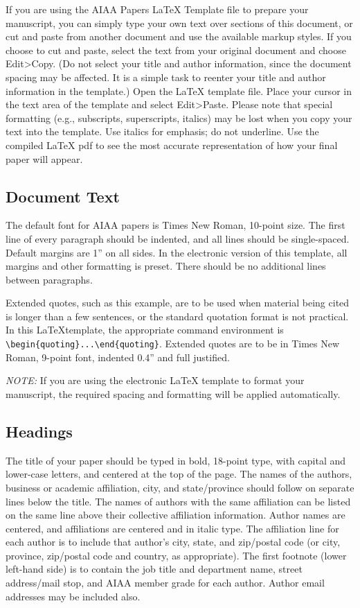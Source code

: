 \documentclass[conf]{new-aiaa}
\begin{document}
If you are using the AIAA Papers \LaTeX{} Template file to prepare your manuscript, you can simply type your own text over sections of this document, or cut and paste from another document and use the available markup styles. If you choose to cut and paste, select the text from your original document and choose Edit>Copy. (Do not select your title and author information, since the document spacing may be affected. It is a simple task to reenter your title and author information in the template.) Open the \LaTeX{} template file. Place your cursor in the text area of the template and select Edit>Paste. Please note that special formatting (e.g., subscripts, superscripts, italics) may be lost when you copy your text into the template. Use italics for emphasis; do not underline. Use the compiled \LaTeX{} pdf to see the most accurate representation of how your final paper will appear.

\subsection{Document Text}
The default font for AIAA papers is Times New Roman, 10-point size.  The first line of every paragraph should be indented, and all lines should be single-spaced. Default margins are 1'' on all sides. In the electronic version of this template, all margins and other formatting is preset. There should be no additional lines between paragraphs.

\begin{quoting}
Extended quotes, such as this example, are to be used when material being cited is longer than a few sentences, or the standard quotation format is not practical. In this \LaTeX template, the appropriate command environment is \verb|\begin{quoting}...\end{quoting}|. Extended quotes are to be in Times New Roman, 9-point font, indented 0.4'' and full justified.
\end{quoting}

\emph{NOTE:} If you are using the electronic \LaTeX{} template to format your manuscript, the required spacing and formatting will be applied automatically.

\subsection{Headings}
The title of your paper should be typed in bold, 18-point type, with capital and lower-case letters, and centered at the top of the page. The names of the authors, business or academic affiliation, city, and state/province should follow on separate lines below the title. The names of authors with the same affiliation can be listed on the same line above their collective affiliation information. Author names are centered, and affiliations are centered and in italic type. The affiliation line for each author is to include that author’s city, state, and zip/postal code (or city, province, zip/postal code and country, as appropriate). The first footnote (lower left-hand side) is to contain the job title and department name, street address/mail stop, and AIAA member grade for each author. Author email addresses may be included also.
\end{document}
